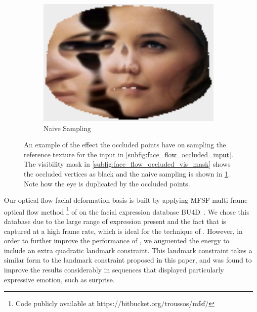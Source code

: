 \begin{figure}[t]
    \begin{subfigure}[b]{0.2\textheight}
        \centering
        \includegraphics[width=\textwidth]{face_flow/images/contour_snapping/sampled_no_snapping}
        \caption{Naive Sampling}\label{subfig:face_flow_occluded_naive}
    \end{subfigure}
    \hspace*{\fill}
    \caption{An example of the effect the occluded points have on sampling the
             reference texture for the input in
             \cref{subfig:face_flow_occluded_input}. The visibility mask in
             \cref{subfig:face_flow_occluded_vis_mask} shows the occluded
             vertices as black and the naive sampling is shown in
             \cref{subfig:face_flow_occluded_naive}. Note how the eye is
             duplicated by the occluded points.}
\label{fig:face_flow_pose_example}
\end{figure}
Our optical flow facial deformation basis is built by applying MFSF multi-frame optical flow method
\footnote{Code publicly available at https://bitbucket.org/troussos/mfsf/} of \citet{garg2013variational} on
the facial expression database BU4D~\cite{yin2008high}. We chose this database due
to the large range of expression present and the fact that is captured at a high
frame rate, which is ideal for the technique of \citet{garg2013variational}. However, in order
to further improve the performance of \citet{garg2013variational}, we augmented the energy
to include an extra quadratic landmark constraint. This landmark constraint
takes a similar form to the landmark constraint proposed in this paper, and was
found to improve the results considerably in sequences that displayed particularly
expressive emotion, such as surprise.

